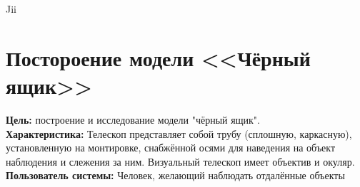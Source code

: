 Jii\section{Постороение модели <<Чёрный ящик>>}

\textbf{Цель:} построение и исследование модели "чёрный ящик".\\

\textbf{Характеристика:} Телескоп представляет собой трубу (сплошную, каркасную), установленную на монтировке, снабжённой осями для наведения на объект наблюдения и слежения за ним. Визуальный телескоп имеет объектив и окуляр.\\

\textbf{Пользователь системы:} Человек, желающий наблюдать отдалённые объекты\\

